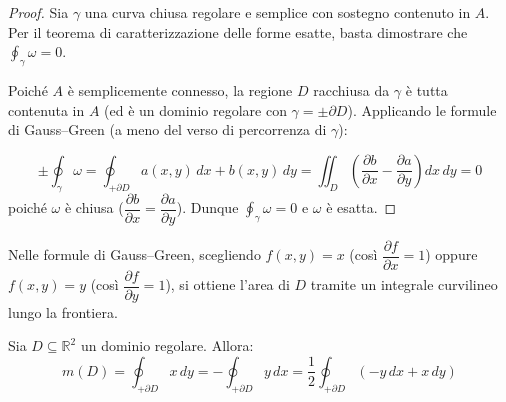 \begin{proof}
Sia $\gamma$ una curva chiusa regolare e semplice con sostegno contenuto in $A$. Per il teorema di caratterizzazione delle forme esatte, basta dimostrare che $\displaystyle\oint_\gamma \omega = 0$.

Poiché $A$ è semplicemente connesso, la regione $D$ racchiusa da $\gamma$ è tutta contenuta in $A$ (ed è un dominio regolare con $\gamma = \pm\partial D$). Applicando le formule di Gauss--Green (a meno del verso di percorrenza di $\gamma$):
\begin{center}
\end{center}
\[
\pm \oint_\gamma \omega
= \oint_{+\partial D} a(x, y)\, dx + b(x, y)\, dy
= \iint_D \left( \frac{\partial b}{\partial x} - \frac{\partial a}{\partial y} \right) dx\, dy
= 0
\]
poiché $\omega$ è chiusa ($\dfrac{\partial b}{\partial x} = \dfrac{\partial a}{\partial y}$). Dunque $\displaystyle\oint_\gamma \omega = 0$ e $\omega$ è esatta.
\end{proof}

\begin{oss}
Nelle formule di Gauss--Green, scegliendo $f(x, y) = x$ (così $\dfrac{\partial f}{\partial x} = 1$) oppure $f(x, y) = y$ (così $\dfrac{\partial f}{\partial y} = 1$), si ottiene l'area di $D$ tramite un integrale curvilineo lungo la frontiera.
\end{oss}

\begin{theorem}
Sia $D \subseteq \mathbb{R}^2$ un dominio regolare. Allora:
\[
m(D) = \oint_{+\partial D} x\, dy = -\oint_{+\partial D} y\, dx = \frac{1}{2} \oint_{+\partial D} \left( -y\, dx + x\, dy \right)
\]
\end{theorem}

